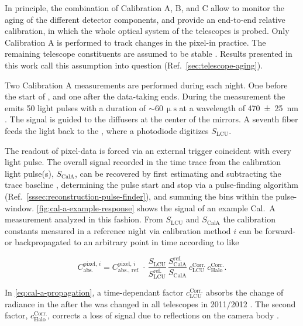 In principle, the combination of Calibration A, B, and C allow to monitor the 
aging of the different detector components, and provide an end-to-end relative
calibration, in which the whole optical system of the telescopes is probed. 
Only Calibration A is performed to track changes in the pixel-\PMTs in 
practice. The  remaining telescope constituents are assumed to be stable
\cite{brackAugerFluorescenceDetector2013, dorofeevFDAbsoluteCalibration2013}. 
Results presented in this work call this assumption into question (Ref.\ 
\cref{sec:telescope-aging}).

Two Calibration A measurements are performed during each night. One before the 
start of \DAQ, and one after the data-taking ends. During the measurement the 
\LED emits 50 light pulses with a duration of $\sim60\,\upmu\mathrm{s}$ at a 
wavelength of \SI{470\pm25}{\nano\meter} \cite{menshikovLEDCalibrationUnit}. 
The signal is guided to the diffusers at the center of the mirrors. A seventh 
fiber feeds the light back to the \LCU, where a photodiode digitizes 
$S_\mathrm{LCU}$. 

The readout of pixel-data is forced via an external trigger coincident with 
every light pulse. The overall signal recorded in the \FD time trace from the 
calibration light pulse(s), $S_\mathrm{CalA}$, can be recovered by first 
estimating and subtracting the trace baseline 
\cite{schaferReconstructionBaselineUndershoot2022}, determining the pulse start
and stop via a pulse-finding algorithm (Ref.\ 
\cref{sssec:reconstruction-pulse-finder}), and summing the \ADC bins within 
the pulse-window. \cref{fig:cal-a-example-response} shows the signal of an 
example Cal.\ A measurement analyzed in this fashion. From $S_\mathrm{LCU}$ and
$S_\mathrm{CalA}$ the calibration constants measured in a reference night via 
calibration method $i$ can be forward- or backpropagated to an arbitrary point 
in time according to \cite{salinaNewCalibrationTask2014, 
salinaAnalisiDatiXY2025} like

\begin{equation}
\label{eq:cal-a-propagation}
C^{\mathrm{pixel},\,i}_{\mathrm{abs.}} = C^{\mathrm{pixel},\,i}_{\mathrm{abs.},\,\mathrm{ref.}}\,\cdot\,\frac{S_\mathrm{LCU}}{S_\mathrm{LCU}^\mathrm{ref.}}\,\frac{S_\mathrm{CalA}^\mathrm{ref.}}{S_\mathrm{CalA}}\,c_\mathrm{LCU}^\mathrm{Corr.}\,c^\mathrm{Corr.}_\mathrm{Halo}.
\end{equation}

In \cref{eq:cal-a-propagation}, a time-dependant factor 
$c^\mathrm{Corr.}_\mathrm{LCU}$ absorbs the change of radiance in the \LCU 
after the \LED was changed in all telescopes in 2011/2012 
\cite{menshikovLEDCalibrationUnit}. The second factor, 
$c^\mathrm{Corr.}_\mathrm{Halo}$, corrects a loss of signal due to reflections 
on the camera body \cite{brackFluorescenceDetectorAbsolute13}.

